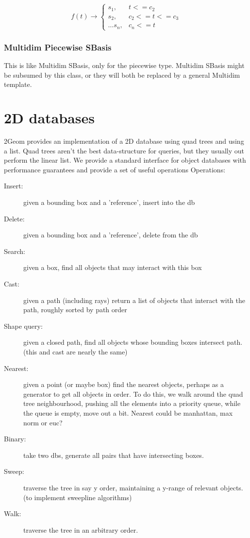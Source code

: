 \documentclass{book}
\begin{document}
$$
f(t) \rightarrow \left\{ 
\begin{array}{cc}
s_1,& t <= c_2 \\
s_2,& c_2 <= t <= c_3\\
\ldots
s_n,& c_n <= t
\end{array}\right.
$$

\subsection{Multidim Piecewise SBasis}
This is like Multidim SBasis, only for the piecewise type.  Multidim
SBasis might be subsumed by this class, or they will both be replaced
by a general Multidim template.

\chapter{2D databases}

2Geom provides an implementation of a 2D database using quad trees and
using a list.  Quad trees aren't the best data-structure for queries,
but they usually out perform the linear list.  We provide a
standard interface for object databases with performance guarantees
and provide a set of useful operations Operations:

\begin{description}
\item[Insert:] given a bounding box and a 'reference', insert into the db
\item[Delete:] given a bounding box and a 'reference', delete from the db
\item[Search:] given a box, find all objects that may interact with this box
\item[Cast:] given a path (including rays) return a list of objects that interact with the path, roughly sorted by path order
\item[Shape query:] given a closed path, find all objects whose bounding boxes intersect path.  (this and cast are nearly the same)
\item[Nearest:] given a point (or maybe box) find the nearest objects, perhaps as a generator to get all objects in order.  To do this, we walk around the quad tree neighbourhood, pushing all the elements into a priority queue, while the queue is empty, move out a bit.  Nearest could be manhattan, max norm or euc?
\item[Binary:] take two dbs, generate all pairs that have intersecting boxes.
\item[Sweep:] traverse the tree in say y order, maintaining a y-range of relevant objects. (to implement sweepline algorithms)
\item[Walk:] traverse the tree in an arbitrary order.
\end{description}
\end{document}
